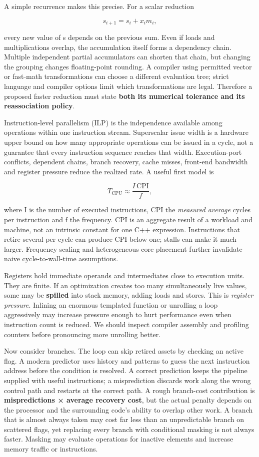A simple recurrence makes this precise. For a scalar reduction

\[
s_{i+1}=s_i+x_i m_i,
\]

every new value of s depends on the previous sum. Even if loads and multiplications overlap, the accumulation itself forms a dependency chain. Multiple independent partial accumulators can shorten that chain, but changing the grouping changes floating-point rounding. A compiler using permitted vector or fast-math transformations can choose a different evaluation tree; strict language and compiler options limit which transformations are legal. Therefore a proposed faster reduction must state \textbf{both its numerical tolerance and its reassociation policy}.

Instruction-level parallelism (ILP) is the independence available among operations within one instruction stream. Superscalar issue width is a hardware upper bound on how many appropriate operations can be issued in a cycle, not a guarantee that every instruction sequence reaches that width. Execution-port conflicts, dependent chains, branch recovery, cache misses, front-end bandwidth and register pressure reduce the realized rate. A useful first model is

\[
T_{\text{CPU}}\approx \frac{I\,\mathrm{CPI}}{f},
\]

where I is the number of executed instructions, CPI the \emph{measured average} cycles per instruction and f the frequency. CPI is an aggregate result of a workload and machine, not an intrinsic constant for one C++ expression. Instructions that retire several per cycle can produce CPI below one; stalls can make it much larger. Frequency scaling and heterogeneous core placement further invalidate naive cycle-to-wall-time assumptions.

Registers hold immediate operands and intermediates close to execution units. They are finite. If an optimization creates too many simultaneously live values, some may be \textbf{spilled} into stack memory, adding loads and stores. This is \emph{register pressure}. Inlining an enormous templated function or unrolling a loop aggressively may increase pressure enough to hurt performance even when instruction count is reduced. We should inspect compiler assembly and profiling counters before pronouncing more unrolling better.

Now consider branches. The loop can skip retired assets by checking an active flag. A modern predictor uses history and patterns to guess the next instruction address before the condition is resolved. A correct prediction keeps the pipeline supplied with useful instructions; a misprediction discards work along the wrong control path and restarts at the correct path. A rough branch-cost contribution is \textbf{mispredictions × average recovery cost}, but the actual penalty depends on the processor and the surrounding code's ability to overlap other work. A branch that is almost always taken may cost far less than an unpredictable branch on scattered flags, yet replacing every branch with conditional masking is not always faster. Masking may evaluate operations for inactive elements and increase memory traffic or instructions.


